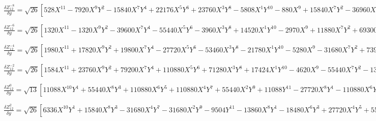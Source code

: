 \documentclass[10pt,landscape]{article}
\begin{document}
\vspace{1.2 mm}
\noindent $ \frac{\delta Z^{-8}_{12}}{\delta y} = \sqrt{26} [528X^{11} -7920X^{9}Y^{2} -15840X^{7}Y^{4} +22176X^{5}Y^{6} +23760X^{3}Y^{8} -5808X^{1}Y^{10} -880X^{9} +15840X^{7}Y^{2} -36960X^{3}Y^{6} +7920X^{1}Y^{8} +360X^{7} -7560X^{5}Y^{2} +12600X^{3}Y^{4} -2520X^{1}Y^{6}] $

\vspace{1.2 mm}
\noindent $ \frac{\delta Z^{-6}_{12}}{\delta y} = \sqrt{26} [1320X^{11} -1320X^{9}Y^{2} -39600X^{7}Y^{4} -55440X^{5}Y^{6} -3960X^{3}Y^{8} +14520X^{1}Y^{10} -2970X^{9} +11880X^{7}Y^{2} +69300X^{5}Y^{4} +27720X^{3}Y^{6} -26730X^{1}Y^{8} +2160X^{7} -15120X^{5}Y^{2} -25200X^{3}Y^{4} +15120X^{1}Y^{6} -504X^{5} +5040X^{3}Y^{2} -2520X^{1}Y^{4}] $

\vspace{1.2 mm}
\noindent $ \frac{\delta Z^{-4}_{12}}{\delta y} = \sqrt{26} [1980X^{11} +17820X^{9}Y^{2} +19800X^{7}Y^{4} -27720X^{5}Y^{6} -53460X^{3}Y^{8} -21780X^{1}Y^{10} -5280X^{9} -31680X^{7}Y^{2} +73920X^{3}Y^{6} +47520X^{1}Y^{8} +5040X^{7} +15120X^{5}Y^{2} -25200X^{3}Y^{4} -35280X^{1}Y^{6} -2016X^{5} +10080X^{1}Y^{4} +280X^{3} -840X^{1}Y^{2}] $

\vspace{1.2 mm}
\noindent $ \frac{\delta Z^{-2}_{12}}{\delta y} = \sqrt{26} [1584X^{11} +23760X^{9}Y^{2} +79200X^{7}Y^{4} +110880X^{5}Y^{6} +71280X^{3}Y^{8} +17424X^{1}Y^{10} -4620X^{9} -55440X^{7}Y^{2} -138600X^{5}Y^{4} -129360X^{3}Y^{6} -41580X^{1}Y^{8} +5040X^{7} +45360X^{5}Y^{2} +75600X^{3}Y^{4} +35280X^{1}Y^{6} -2520X^{5} -15120X^{3}Y^{2} -12600X^{1}Y^{4} +560X^{3} +1680X^{1}Y^{2} -42X^{1}] $

\vspace{1.2 mm}
\noindent $ \frac{\delta Z^{0}_{12}}{\delta y} = \sqrt{13} [11088X^{10}Y^{1} +55440X^{8}Y^{3} +110880X^{6}Y^{5} +110880X^{4}Y^{7} +55440X^{2}Y^{9} +11088Y^{11} -27720X^{8}Y^{1} -110880X^{6}Y^{3} -166320X^{4}Y^{5} -110880X^{2}Y^{7} -27720Y^{9} +25200X^{6}Y^{1} +75600X^{4}Y^{3} +75600X^{2}Y^{5} +25200Y^{7} -10080X^{4}Y^{1} -20160X^{2}Y^{3} -10080Y^{5} +1680X^{2}Y^{1} +1680Y^{3} -84Y^{1}] $

\vspace{1.2 mm}
\noindent $ \frac{\delta Z^{2}_{12}}{\delta y} = \sqrt{26} [6336X^{10}Y^{1} +15840X^{8}Y^{3} -31680X^{4}Y^{7} -31680X^{2}Y^{9} -9504Y^{11} -13860X^{8}Y^{1} -18480X^{6}Y^{3} +27720X^{4}Y^{5} +55440X^{2}Y^{7} +23100Y^{9} +10080X^{6}Y^{1} -30240X^{2}Y^{5} -20160Y^{7} -2520X^{4}Y^{1} +5040X^{2}Y^{3} +7560Y^{5} -1120Y^{3} +42Y^{1}] $
\end{document}
